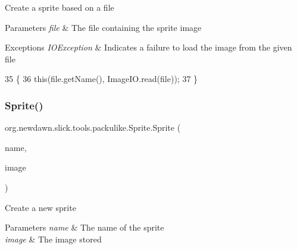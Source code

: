 Create a sprite based on a file


\begin{DoxyParams}{Parameters}
{\em file} & The file containing the sprite image \\
\hline
\end{DoxyParams}

\begin{DoxyExceptions}{Exceptions}
{\em I\+O\+Exception} & Indicates a failure to load the image from the given file \\
\hline
\end{DoxyExceptions}

\begin{DoxyCode}
35                                                 \{
36         \textcolor{keyword}{this}(file.getName(), ImageIO.read(file));
37     \}
\end{DoxyCode}
\mbox{\label{classorg_1_1newdawn_1_1slick_1_1tools_1_1packulike_1_1_sprite_a16d8d848f46dc7b60cbfcfad58c351f5}} 
\subsubsection{\texorpdfstring{Sprite()}{Sprite()}\hspace{0.1cm}{\footnotesize\ttfamily [2/2]}}
{\footnotesize\ttfamily org.\+newdawn.\+slick.\+tools.\+packulike.\+Sprite.\+Sprite (\begin{DoxyParamCaption}\item[{String}]{name,  }\item[{Buffered\+Image}]{image }\end{DoxyParamCaption})\hspace{0.3cm}{\ttfamily [inline]}}

Create a new sprite


\begin{DoxyParams}{Parameters}
{\em name} & The name of the sprite \\
\hline
{\em image} & The image stored \\
\hline
\end{DoxyParams}

